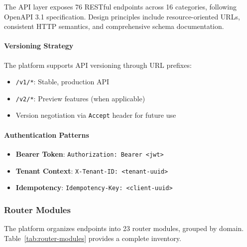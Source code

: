 The API layer exposes 76 RESTful endpoints across 16 categories, following OpenAPI 3.1 specification. Design principles include resource-oriented URLs, consistent HTTP semantics, and comprehensive schema documentation.

\paragraph{Versioning Strategy}
The platform supports API versioning through URL prefixes:
\begin{itemize}
    \item \texttt{/v1/*}: Stable, production API
    \item \texttt{/v2/*}: Preview features (when applicable)
    \item Version negotiation via \texttt{Accept} header for future use
\end{itemize}

\paragraph{Authentication Patterns}
\begin{itemize}
    \item \textbf{Bearer Token}: \texttt{Authorization: Bearer <jwt>}
    \item \textbf{Tenant Context}: \texttt{X-Tenant-ID: <tenant-uuid>}
    \item \textbf{Idempotency}: \texttt{Idempotency-Key: <client-uuid>}
\end{itemize}

\subsubsection{Router Modules}
\label{subsubsec:router-modules}

The platform organizes endpoints into 23 router modules, grouped by domain. Table~\ref{tab:router-modules} provides a complete inventory.

